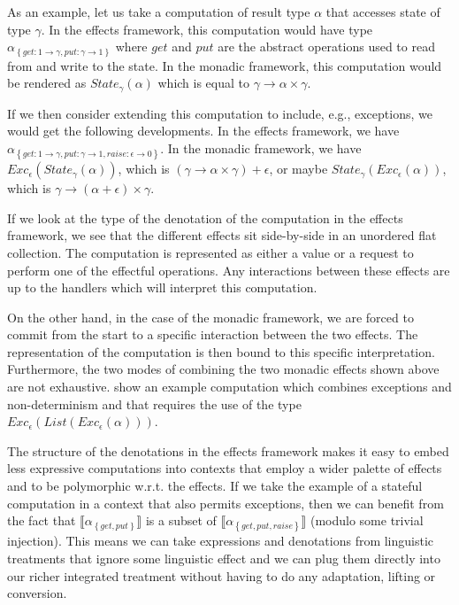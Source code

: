 \documentclass{article}
\newcommand{\sem}[1]{\llbracket #1 \rrbracket}
\begin{document}
As an example, let us take a computation of result type $\alpha$ that accesses
state of type $\gamma$. In the effects framework, this computation would have
type $\alpha_{\left\{get : 1 \to \gamma, put : \gamma \to 1\right\}}$ where
$get$ and $put$ are the abstract operations used to read from and write to the
state. In the monadic framework, this computation would be rendered as
$State_\gamma(\alpha)$ which is equal to $\gamma \to \alpha \times \gamma$.

If we then consider extending this computation to include, e.g., exceptions,
we would get the following developments. In the effects framework, we have
$\alpha_{\left\{get : 1 \to \gamma, put : \gamma \to 1, raise : \epsilon \to
  0\right\}}$. In the monadic framework, we have
$Exc_\epsilon(State_\gamma(\alpha))$, which is $(\gamma \to \alpha \times
\gamma) + \epsilon$, or maybe $State_\gamma(Exc_\epsilon(\alpha))$, which is
$\gamma \to (\alpha + \epsilon) \times \gamma$.

If we look at the type of the denotation of the computation in the effects
framework, we see that the different effects sit side-by-side in an unordered
flat collection. The computation is represented as either a value or a request
to perform one of the effectful operations. Any interactions between these
effects are up to the handlers which will interpret this computation.

On the other hand, in the case of the monadic framework, we are forced to
commit from the start to a specific interaction between the two effects. The
representation of the computation is then bound to this specific
interpretation. Furthermore, the two modes of combining the two monadic
effects shown above are not exhaustive. \citet{kiselyov2013extensible} show an
example computation which combines exceptions and non-determinism and that
requires the use of the type $Exc_\epsilon(List(Exc_\epsilon(\alpha)))$.

The structure of the denotations in the effects framework makes it easy to
embed less expressive computations into contexts that employ a wider palette
of effects and to be polymorphic w.r.t. the effects. If we take the example of
a stateful computation in a context that also permits exceptions, then we can
benefit from the fact that $\sem{\alpha_{\left\{get, put\right\}}}$ is a
subset of $\sem{\alpha_{\left\{get, put, raise\right\}}}$ (modulo some trivial
injection). This means we can take expressions and denotations from linguistic
treatments that ignore some linguistic effect and we can plug them directly
into our richer integrated treatment without having to do any adaptation,
lifting or conversion.
\end{document}

